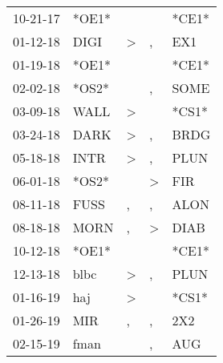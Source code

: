 \begin{supertabular}{p{0.07\textwidth}p{0.06\textwidth}p{0.02\textwidth}p{0.02\textwidth}p{0.06\textwidth}}
          10-21-17\textsuperscript{} &                            *OE1* &                  &               &                   *CE1* \\
          01-12-18\textsuperscript{} &           DIGI\textsuperscript{} &     \textgreater &             , &   EX1\textsuperscript{} \\
          01-19-18\textsuperscript{} &                            *OE1* &                  &               &                   *CE1* \\
          02-02-18\textsuperscript{} &                            *OS2* &                  &             , &  SOME\textsuperscript{} \\
          03-09-18\textsuperscript{} &           WALL\textsuperscript{} &     \textgreater &               &                   *CS1* \\
          03-24-18\textsuperscript{} &           DARK\textsuperscript{} &     \textgreater &             , &  BRDG\textsuperscript{} \\
          05-18-18\textsuperscript{} &           INTR\textsuperscript{} &     \textgreater &             , &  PLUN\textsuperscript{} \\
          06-01-18\textsuperscript{} &                            *OS2* &                  &  \textgreater &   FIR\textsuperscript{} \\
          08-11-18\textsuperscript{} &           FUSS\textsuperscript{} &                , &             , &  ALON\textsuperscript{} \\
          08-18-18\textsuperscript{} &           MORN\textsuperscript{} &                , &  \textgreater &  DIAB\textsuperscript{} \\
          10-12-18\textsuperscript{} &                            *OE1* &                  &               &                   *CE1* \\
          12-13-18\textsuperscript{} &           blbc\textsuperscript{} &     \textgreater &             , &  PLUN\textsuperscript{} \\
          01-16-19\textsuperscript{} &            haj\textsuperscript{} &     \textgreater &               &                   *CS1* \\
          01-26-19\textsuperscript{} &            MIR\textsuperscript{} &                , &             , &   2X2\textsuperscript{} \\
          02-15-19\textsuperscript{} &           fman\textsuperscript{} &                  &             , &   AUG\textsuperscript{} \\

\end{supertabular}
